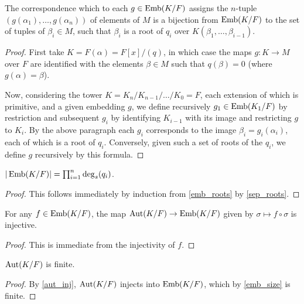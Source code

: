 \begin{lemma} The correspondence which to each $g \in \operatorname{\text{Emb}}(K/F)$ assigns the
$n$-tuple $(g(\alpha_1), \dots, g(\alpha_n))$ of elements of $M$ is a
bijection from $\operatorname{\text{Emb}}(K/F)$ to the set of tuples of $\beta_i \in M$, such that
$\beta_i$ is a root of $q_i$ over $K(\beta_1, \dots, \beta_{i - 1})$.
\label{emb_roots}
\end{lemma}

\begin{proof} First take $K = F(\alpha) = F[x]/(q)$, in which case the maps $g
\colon K \to M$ over $F$ are identified with the elements $\beta \in M$ such
that $q(\beta) = 0$ (where $g(\alpha) = \beta$).

Now, considering the tower $K = K_n / K_{n - 1} / \dots / K_0 = F$, each
extension of which is primitive, and a given embedding $g$, we define
recursively $g_1 \in \operatorname{\text{Emb}}(K_1/F)$ by restriction and subsequent $g_i$ by
identifying $K_{i - 1}$ with its image and restricting $g$ to $K_i$.  By the
above paragraph each $g_i$ corresponds to the image $\beta_i = g_i(\alpha_i)$,
each of which is a root of $q_i$.  Conversely, given such a set of roots of
the $q_i$, we define $g$ recursively by this formula. \end{proof}

\begin{corollary} $|\operatorname{\text{Emb}}(K/F)| = \prod_{i = 1}^n \deg_s(q_i)$.
\label{emb_size}
\end{corollary}

\begin{proof} This follows immediately by induction from \ref{emb_roots} by
\ref{sep_roots}. \end{proof}

\begin{lemma} For any $f \in \operatorname{\text{Emb}}(K/F)$, the map $\operatorname{\text{Aut}}(K/F) \to \operatorname{\text{Emb}}(K/F)$ given
by $\sigma \mapsto f \circ \sigma$ is injective.  
\label{aut_inj}
\end{lemma}

\begin{proof} This is immediate from the injectivity of $f$. \end{proof}

\begin{corollary} $\operatorname{\text{Aut}}(K/F)$ is finite.
\label{aut_fin}
\end{corollary}

\begin{proof} By \ref{aut_inj}, $\operatorname{\text{Aut}}(K/F)$ injects into $\operatorname{\text{Emb}}(K/F)$, which by
\ref{emb_size} is finite. \end{proof}

